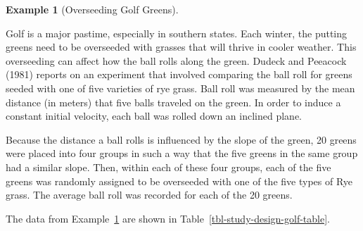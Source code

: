 \documentclass[
  letterpaper,
  DIV=11,
  numbers=noendperiod]{scrreprt}
\theoremstyle{definition}
\theoremstyle{plain}
\theoremstyle{definition}
\newtheorem{example}{Example}[chapter]
\theoremstyle{remark}
\begin{document}
\begin{example}[Overseeding Golf
Greens]\protect\hypertarget{exm-study-design-golf}{}\label{exm-study-design-golf}

Golf is a major pastime, especially in southern states. Each winter, the
putting greens need to be overseeded with grasses that will thrive in
cooler weather. This overseeding can affect how the ball rolls along the
green. Dudeck and Peeacock (1981) reports on an experiment that involved
comparing the ball roll for greens seeded with one of five varieties of
rye grass. Ball roll was measured by the mean distance (in meters) that
five balls traveled on the green. In order to induce a constant initial
velocity, each ball was rolled down an inclined plane.

Because the distance a ball rolls is influenced by the slope of the
green, 20 greens were placed into four groups in such a way that the
five greens in the same group had a similar slope. Then, within each of
these four groups, each of the five greens was randomly assigned to be
overseeded with one of the five types of Rye grass. The average ball
roll was recorded for each of the 20 greens.

\end{example}

The data from Example~\ref{exm-study-design-golf} are shown in
Table~\ref{tbl-study-design-golf-table}.
\end{document}

